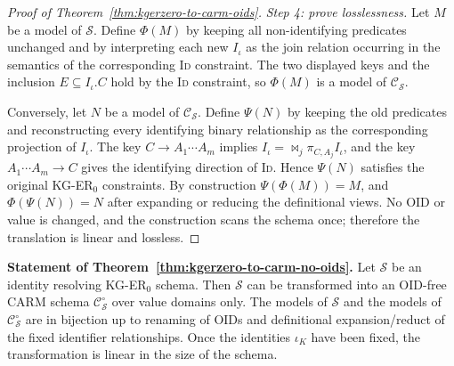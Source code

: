 \documentclass[10pt]{article}
\begin{document}
\begin{proof}[Proof of Theorem~\ref{thm:kgerzero-to-carm-oids}]
\emph{Step 4: prove losslessness.}
Let $M$ be a model of $\mathcal S$.  Define $\Phi(M)$ by keeping all
non-identifying predicates unchanged and by interpreting each new
$I_\iota$ as the join relation occurring in the semantics of the
corresponding \textsc{Id} constraint.  The two displayed keys and the inclusion
$E\subseteq I_\iota.C$ hold by the \textsc{Id} constraint, so $\Phi(M)$ is a
model of $\mathcal C_{\mathcal S}$.

Conversely, let $N$ be a model of $\mathcal C_{\mathcal S}$.  Define
$\Psi(N)$ by keeping the old predicates and reconstructing every
identifying binary relationship as the corresponding projection of
$I_\iota$.  The key $C\to A_1\cdots A_m$ implies
$I_\iota=\bowtie_j\pi_{C,A_j}I_\iota$, and the key
$A_1\cdots A_m\to C$ gives the identifying direction of
\textsc{Id}.  Hence $\Psi(N)$ satisfies the original KG-ER$_0$
constraints.  By construction $\Psi(\Phi(M))=M$, and
$\Phi(\Psi(N))=N$ after expanding or reducing the definitional views.
No OID or value is changed, and the construction scans the schema once;
therefore the translation is linear and lossless.
\end{proof}

\noindent\textbf{Statement of Theorem~\ref{thm:kgerzero-to-carm-no-oids}.}
Let $\mathcal S$ be an identity resolving KG-ER$_0$ schema.  
Then $\mathcal S$ can be transformed into an OID-free \textsf{CARM}
schema $\mathcal C^\circ_{\mathcal S}$ over value domains only.  The
models of $\mathcal S$ and the models of
$\mathcal C^\circ_{\mathcal S}$ are in bijection up to renaming of OIDs
and definitional expansion/reduct of the fixed identifier relationships.
Once the identities $\iota_K$ have been fixed, the transformation is
linear in the size of the schema.
\end{document}
